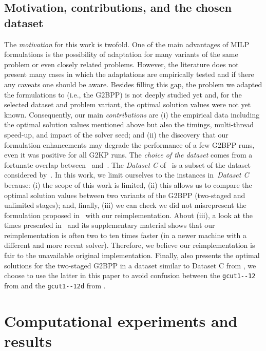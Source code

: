 \documentclass[9pt]{entcs}
\begin{document}
\subsection{Motivation, contributions, and the chosen dataset}

The \emph{motivation} for this work is twofold.
One of the main advantages of MILP formulations is the possibility of adaptation for many variants of the same problem or even closely related problems.
However, the literature does not present many cases in which the adaptations are empirically tested and if there any caveats one should be aware.
Besides filling this gap, the problem we adapted the formulations to (i.e., the G2BPP) is not deeply studied yet and, for the selected dataset and problem variant, the optimal solution values were not yet known.
Consequently, our main \emph{contributions} are (i) the empirical data including the optimal solution values mentioned above but also the timings, multi-thread speed-up, and impact of the solver seed; and (ii) the discovery that our formulation enhancements may degrade the performance of a few G2BPP runs, even it was positive for all G2KP runs.
The \emph{choice of the dataset} comes from a fortunate overlap between~\cite{furini:2016} and~\cite{silva:2010}.
The \emph{Dataset C} of~\cite{silva:2010} is a subset of the dataset considered by~\cite{furini:2016}.
In this work, we limit ourselves to the instances in~\emph{Dataset C} because: (i) the scope of this work is limited, (ii) this allows us to compare the optimal solution values between two variants of the G2BPP (two-staged and unlimited stages); and, finally, (iii) we can check we did not misrepresent the formulation proposed in~\cite{furini:2016} with our reimplementation.
About (iii), a look at the times presented in~\cite{furini:2016} and its supplementary material shows that our reimplementation is often two to ten times faster (in a newer machine with a different and more recent solver).
Therefore, we believe our reimplementation is fair to the unavailable original implementation.
Finally, \cite{furini:2013} also presents the optimal solutions for the two-staged G2BPP in a dataset similar to Dataset C from \cite{silva:2010}, we choose to use the latter in this paper to avoid confusion between the \verb+gcut1--12+ from \cite{furini:2016} and the \verb+gcut1--12d+ from \cite{furini:2013}.

\section{Computational experiments and results}
\end{document}
